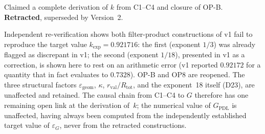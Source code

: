 \documentclass[12pt,a4paper]{article}
\theoremstyle{plain}
\theoremstyle{definition}
\theoremstyle{remark}
\newcommand{\kap}{\kappa}
\newcommand{\rval}{r_{\mathrm{val}}}
\newcommand{\Rtot}{R_{\mathrm{tot}}}
\newcommand{\egeom}{\varepsilon_{\mathrm{geom}}}
\newcommand{\eG}{\varepsilon_G}
\begin{document}
\begin{description}[nosep]
\item[Version~1] Claimed a complete derivation of $k$ from C1--C4 and closure of OP-B. \textbf{Retracted}, superseded by Version~2.
\item[Version~2] Independent re-verification shows both filter-product constructions of v1 fail to reproduce the target value $k_{\exp}=0.921716$: the first (exponent $1/3$) was already flagged as discrepant in v1; the second (exponent $1/18$), presented in v1 as a correction, is shown here to rest on an arithmetic error (v1 reported $0.92172$ for a quantity that in fact evaluates to $0.7328$). OP-B and OP8 are reopened. The three structural factors $\egeom$, $\kap$, $\rval/\Rtot$, and the exponent~18 itself (D23), are unaffected and retained. The causal chain from C1--C4 to $G$ therefore has one remaining open link at the derivation of~$k$; the numerical value of $G_{\mathrm{PDL}}$ is unaffected, having always been computed from the independently established target value of $\eG$, never from the retracted constructions.
\end{description}



\end{document}
